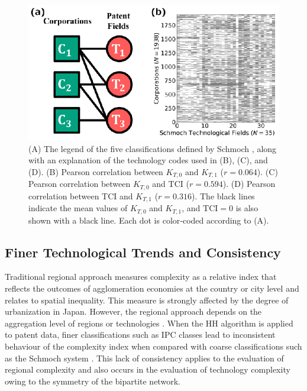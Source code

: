 \documentclass[fleqn,10pt]{wlscirep}
\begin{document}
\begin{figure}[ht]
    \centering
    \includegraphics[scale=1.00]{Figs/Fig1.eps}
    \caption{(A) The legend of the five classifications defined by Schmoch \cite{Schmoch2008}, along with an explanation of the technology codes used in (B), (C), and (D).
    (B) Pearson correlation between \(K_{T,0}\) and \(K_{T,1}\) (\(r=0.064\)).
    (C) Pearson correlation between \(K_{T,0}\) and TCI (\(r=0.594\)).
    (D) Pearson correlation between TCI and \(K_{T,1}\) (\(r=0.316\)).
    The black lines indicate the mean values of \(K_{T,0}\) and \(K_{T,1}\), and \(\text{TCI} = 0\) is also shown with a black line. Each dot is color‐coded according to (A).
    }
    \label{fig:scatter}
\end{figure}

\subsection*{Finer Technological Trends and Consistency}

Traditional regional approach measures complexity as a relative index that reflects the outcomes of agglomeration economies at the country or city level \cite{hartmann2024economic} and relates to spatial inequality. 
This measure is strongly affected by the degree of urbanization in Japan. 
However, the regional approach depends on the aggregation level of regions or technologies \cite{Hidalgo2021}. 
When the HH algorithm is applied to patent data, finer classifications such as IPC classes lead to inconsistent behaviour of the complexity index when compared with coarse classifications such as the Schmoch system \cite{PintarEssletzbichler2022}. 
This lack of consistency applies to the evaluation of regional complexity and also occurs in the evaluation of technology complexity owing to the symmetry of the bipartite network.
\end{document}
